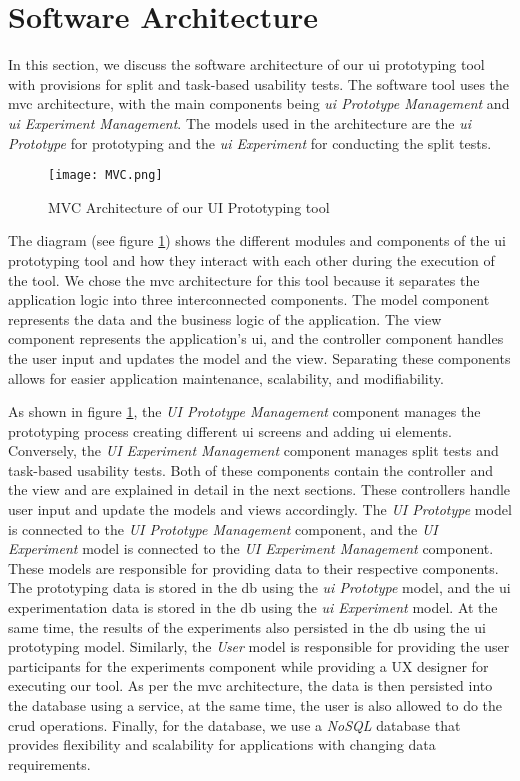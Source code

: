 \section{Software Architecture}
\label{sc:section:architecture}
In this section, we discuss the software architecture of our \ac{ui} prototyping tool with provisions for split and task-based usability tests. 
The software tool uses the \ac{mvc} architecture, with the main components being \textit{\ac{ui} Prototype Management} and \textit{\ac{ui} Experiment Management}. 
The models used in the architecture are the \textit{\ac{ui} Prototype} for prototyping and the \textit{\ac{ui} Experiment} for conducting the split tests. 
\begin{figure}[htbp!]
    \centering    
    \texttt{[image: MVC.png]} 
    \caption[MVC Architecture of the System]{MVC Architecture of our UI Prototyping tool}
    \label{fig:sc:componentD}
\end{figure}
The diagram (see figure \ref{fig:sc:componentD}) shows the different modules and components of the \ac{ui} prototyping tool and how they interact with each other during the execution of the tool.
We chose the \ac{mvc} architecture for this tool because it separates the application logic into three interconnected components. 
The model component represents the data and the business logic of the application. 
The view component represents the application's \ac{ui}, and the controller component handles the user input and updates the model and the view. 
Separating these components allows for easier application maintenance, scalability, and modifiability.

As shown in figure \ref{fig:sc:componentD}, the \textit{UI Prototype Management} component manages the prototyping process creating different \ac{ui} screens and adding \ac{ui} elements. 
Conversely, the \textit{UI Experiment Management} component manages split tests and task-based usability tests.
Both of these components contain the controller and the view and are explained in detail in the next sections. 
These controllers handle user input and update the models and views accordingly.
The \textit{UI Prototype} model is connected to the \textit{UI Prototype Management} component, and the \textit{UI Experiment} model is connected to the \textit{UI Experiment Management} component.
These models are responsible for providing data to their respective components.
The prototyping data is stored in the \ac{db} using the \textit{\ac{ui} Prototype} model, and the \ac{ui} experimentation data is stored in the \ac{db} using the \textit{\ac{ui} Experiment} model.
At the same time, the results of the experiments also persisted in the \ac{db} using the \ac{ui} prototyping model.
Similarly, the \textit{User} model is responsible for providing the user participants for the experiments component while providing a UX designer for executing our tool.
As per the \ac{mvc} architecture, the data is then persisted into the database using a service, at the same time, the user is also allowed to do the \ac{crud} operations.  
Finally, for the database, we use a \textit{NoSQL} database that provides flexibility and scalability for applications with changing data requirements. 

